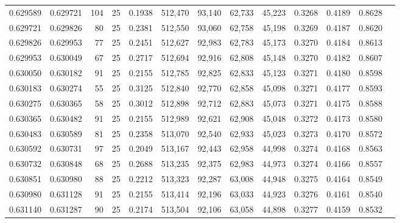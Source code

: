 \begin{tabular}{rrrrrrrrrrrrr}
0.629589 & 0.629721 &   104 &  25 &                                     0.1938 & 512,470 &  93,140 &  62,733 &  45,223 & 0.3268 & 0.4189 & 0.8628 \\
0.629721 & 0.629826 &    80 &  25 &                                     0.2381 & 512,550 &  93,060 &  62,758 &  45,198 & 0.3269 & 0.4187 & 0.8620 \\
0.629826 & 0.629953 &    77 &  25 &                                     0.2451 & 512,627 &  92,983 &  62,783 &  45,173 & 0.3270 & 0.4184 & 0.8613 \\
0.629953 & 0.630049 &    67 &  25 &                                     0.2717 & 512,694 &  92,916 &  62,808 &  45,148 & 0.3270 & 0.4182 & 0.8607 \\
0.630050 & 0.630182 &    91 &  25 &                                     0.2155 & 512,785 &  92,825 &  62,833 &  45,123 & 0.3271 & 0.4180 & 0.8598 \\
0.630183 & 0.630274 &    55 &  25 &                                     0.3125 & 512,840 &  92,770 &  62,858 &  45,098 & 0.3271 & 0.4177 & 0.8593 \\
0.630275 & 0.630365 &    58 &  25 &                                     0.3012 & 512,898 &  92,712 &  62,883 &  45,073 & 0.3271 & 0.4175 & 0.8588 \\
0.630365 & 0.630482 &    91 &  25 &                                     0.2155 & 512,989 &  92,621 &  62,908 &  45,048 & 0.3272 & 0.4173 & 0.8580 \\
0.630483 & 0.630589 &    81 &  25 &                                     0.2358 & 513,070 &  92,540 &  62,933 &  45,023 & 0.3273 & 0.4170 & 0.8572 \\
0.630592 & 0.630731 &    97 &  25 &                                     0.2049 & 513,167 &  92,443 &  62,958 &  44,998 & 0.3274 & 0.4168 & 0.8563 \\
0.630732 & 0.630848 &    68 &  25 &                                     0.2688 & 513,235 &  92,375 &  62,983 &  44,973 & 0.3274 & 0.4166 & 0.8557 \\
0.630851 & 0.630980 &    88 &  25 &                                     0.2212 & 513,323 &  92,287 &  63,008 &  44,948 & 0.3275 & 0.4164 & 0.8549 \\
0.630980 & 0.631128 &    91 &  25 &                                     0.2155 & 513,414 &  92,196 &  63,033 &  44,923 & 0.3276 & 0.4161 & 0.8540 \\
0.631140 & 0.631287 &    90 &  25 &                                     0.2174 & 513,504 &  92,106 &  63,058 &  44,898 & 0.3277 & 0.4159 & 0.8532 \\

\end{tabular}
